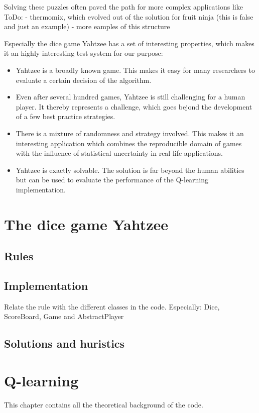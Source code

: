 \documentclass{article}
\begin{document}
Solving these puzzles often paved the path for more complex applications like
ToDo:
- thermomix, which evolved out of the solution for fruit ninja (this is false and just an example)
- more eamples of this structure

Especially the dice game Yahtzee has a set of interesting properties,
which makes it an highly interesting test system for our purpose:
\begin{itemize}
\item Yahtzee is a broadly known game.
This makes it easy for many researchers to evaluate a certain decision of the algorithm.
\item Even after several hundred games, Yahtzee is still challenging for a human player.
It thereby represents a challenge, which goes bejond the development of a few best practice strategies.
\item There is a mixture of randomness and strategy involved.
This makes it an interesting application which combines the reproducible domain of games
with the influence of statistical uncertainty in real-life applications.
\item Yahtzee is exactly solvable.
The solution is far beyond the human abilities but can be used to evaluate the performance
of the Q-learning implementation.
\end{itemize}


\section{The dice game Yahtzee}

\subsection{Rules}
\subsection{Implementation}
Relate the rule with the different classes in the code.
Especially: Dice, ScoreBoard, Game and AbstractPlayer
\subsection{Solutions and huristics}


\section{Q-learning}
This chapter contains all the theoretical background of the code.
\end{document}
